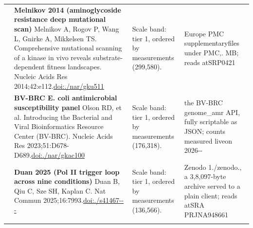 \begin{landscape}
\begin{longtable}{@{}r@{\hspace{4pt}} L{78mm} L{72mm} L{76mm}@{}}
 & \textbf{Melnikov 2014 (aminoglycoside resistance deep mutational scan)} \newline Melnikov A, Rogov P, Wang L, Gnirke A, Mikkelsen TS. Comprehensive mutational scanning of a kinase in vivo reveals substrate-dependent fitness landscapes. Nucleic Acids Res 2014;42:e112.\newline \href{https://doi.org/10.1093/nar/gku511}{doi:./\allowbreak nar/\allowbreak gku511} & Scale band: tier 1, ordered by measurements (299,580). & Europe P\allowbreak MC suppl\allowbreak ementary\allowbreak  files u\allowbreak nder PMC,. MB; \allowbreak reads at\allowbreak  SRP0421 \\
 & \textbf{BV-BRC E. coli antimicrobial susceptibility panel} \newline Olson RD, et al. Introducing the Bacterial and Viral Bioinformatics Resource Center (BV-BRC). Nucleic Acids Res 2023;51:D678-D689.\newline \href{https://doi.org/10.1093/nar/gkac1003}{doi:./\allowbreak nar/\allowbreak gkac100} & Scale band: tier 1, ordered by measurements (176,318). & the BV-\allowbreak BRC gen\allowbreak ome\_\allowbreak amr API\allowbreak , fully \allowbreak scriptab\allowbreak le as JS\allowbreak ON; coun\allowbreak ts measu\allowbreak red live\allowbreak  on 2026\allowbreak -- \\
 & \textbf{Duan 2025 (Pol II trigger loop across nine conditions)} \newline Duan B, Qiu C, Sze SH, Kaplan C. Nat Commun 2025;16:7993.\newline \href{https://doi.org/10.1038/s41467-025-63304-6}{doi:./\allowbreak s41467---} & Scale band: tier 1, ordered by measurements (136,566). & Zenodo 1./\allowbreak zenodo., a 3,8,097-\allowbreak byte ar\allowbreak chive se\allowbreak rved to \allowbreak a plain \allowbreak client; \allowbreak reads at\allowbreak  SRA PRJ\allowbreak NA948661 \\
\addlinespace[5pt]

\end{longtable}
\end{landscape}
